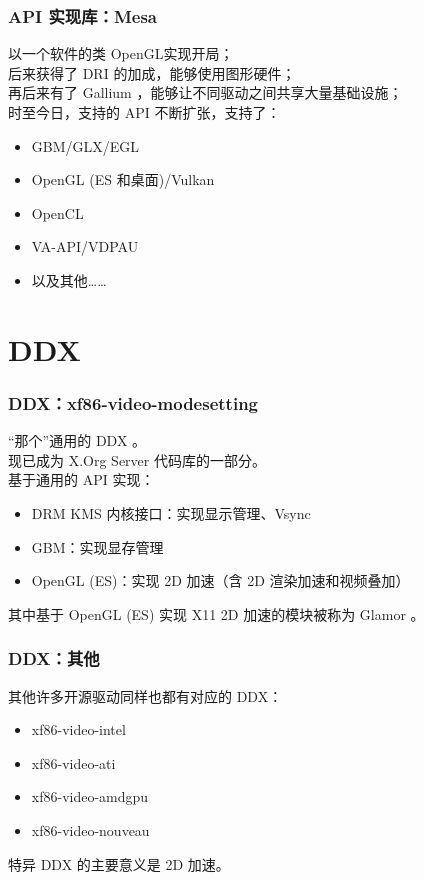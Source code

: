 \documentclass{ctexbeamer}
\begin{document}
\begin{frame}
    \frametitle{API 实现库：Mesa}
    以一个软件的类 OpenGL\textregistered 实现开局；\\
    后来获得了 DRI 的加成，能够使用图形硬件；\\
    再后来有了 Gallium ，能够让不同驱动之间共享大量基础设施；\\
    时至今日，支持的 API 不断扩张，支持了：\\
    \begin{itemize}
        \item GBM/GLX/EGL
        \item OpenGL (ES 和桌面)/Vulkan
        \item OpenCL
        \item VA-API/VDPAU
        \item 以及其他……
    \end{itemize}
\end{frame}

\section{DDX}

\begin{frame}
    \frametitle{DDX：xf86-video-modesetting}
    “那个”通用的 DDX 。\\
    现已成为 X.Org Server 代码库的一部分。\\
    基于通用的 API 实现：\\
    \begin{itemize}
        \item DRM KMS 内核接口：实现显示管理、Vsync
        \item GBM：实现显存管理
        \item OpenGL (ES)：实现 2D 加速（含 2D 渲染加速和视频叠加）
    \end{itemize}
    其中基于 OpenGL (ES) 实现 X11 2D 加速的模块被称为 Glamor 。
\end{frame}

\begin{frame}
    \frametitle{DDX：其他}
    其他许多开源驱动同样也都有对应的 DDX：
    \begin{itemize}
        \item xf86-video-intel
        \item xf86-video-ati
        \item xf86-video-amdgpu
        \item xf86-video-nouveau
    \end{itemize}
    特异 DDX 的主要意义是 2D 加速。
\end{frame}
\end{document}
